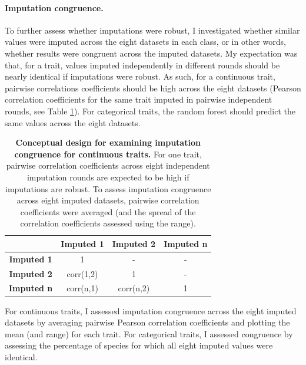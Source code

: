 \paragraph{Imputation congruence.} To further assess whether imputations were robust, I investigated whether similar values were imputed across the eight datasets in each class, or in other words, whether results were congruent across the imputed datasets.  My expectation was that, for a trait, values imputed independently in different rounds should be nearly identical if imputations were robust. As such, for a continuous trait, pairwise correlations coefficients should be high across the eight datasets (Pearson correlation coefficients for the same trait imputed in pairwise independent rounds, see Table \ref{pairwisecorr}). For categorical traits, the random forest should predict the same values across the eight datasets. 

\begin{table}[h!]
\renewcommand{\baselinestretch}{1}
\renewcommand{\arraystretch}{1.5}
\begin{center}\fontsize{9}{11}\selectfont
\caption[Conceptual design for examining imputation congruence for continuous traits]{\textbf{Conceptual design for examining imputation congruence for continuous traits.} For one trait, pairwise correlation coefficients across eight independent imputation rounds are expected to be high if imputations are robust. To assess imputation congruence across eight imputed datasets, pairwise correlation coefficients were averaged (and the spread of the correlation coefficients assessed using the range).} 
\label{pairwisecorr}
 \begin{tabular}{c|c|c|c|}
\cline{2-4}
\multicolumn{1}{l|}{}                    & \textbf{Imputed 1} & \textbf{Imputed 2} & \textbf{Imputed n} \\ \hline
\multicolumn{1}{|c|}{\textbf{Imputed 1}} & 1                  & -                  & -                  \\ \hline
\multicolumn{1}{|c|}{\textbf{Imputed 2}} & corr(1,2)          & 1                  & -                  \\ \hline
\multicolumn{1}{|c|}{\textbf{Imputed n}} & corr(n,1)          & corr(n,2)          & 1                  \\ \hline
\end{tabular}
\end{center}
\end{table}


For continuous traits, I assessed imputation congruence across the eight imputed datasets by averaging pairwise Pearson correlation coefficients and plotting the mean (and range) for each trait. For categorical traits, I assessed congruence by assessing the percentage of species for which all eight imputed values were identical.

